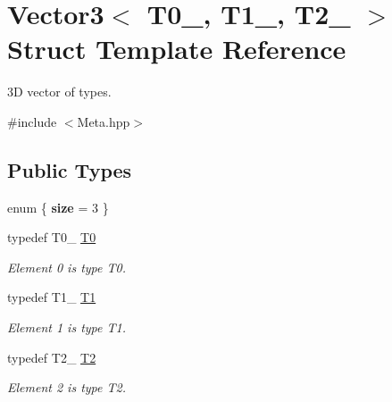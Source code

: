 \hypertarget{struct_d_o_1_1_meta_1_1_vector3}{\section{Vector3$<$ T0\-\_\-, T1\-\_\-, T2\-\_\- $>$ Struct Template Reference}
\label{struct_d_o_1_1_meta_1_1_vector3}
}


3\-D vector of types.  




{\ttfamily \#include $<$Meta.\-hpp$>$}

\subsection*{Public Types}
\begin{DoxyCompactItemize}
\item 
enum \{ {\bfseries size} = 3
 \}
\item 
\hypertarget{struct_d_o_1_1_meta_1_1_vector3_a6f4dd1548d86d57a7e5bdf98e74025cd}{typedef T0\-\_\- \hyperlink{struct_d_o_1_1_meta_1_1_vector3_a6f4dd1548d86d57a7e5bdf98e74025cd}{T0}}\label{struct_d_o_1_1_meta_1_1_vector3_a6f4dd1548d86d57a7e5bdf98e74025cd}

\begin{DoxyCompactList}\small\item\em Element 0 is type T0. \end{DoxyCompactList}\item 
\hypertarget{struct_d_o_1_1_meta_1_1_vector3_ae11d8678c6e0ac8e98f27b6dfdb5d73e}{typedef T1\-\_\- \hyperlink{struct_d_o_1_1_meta_1_1_vector3_ae11d8678c6e0ac8e98f27b6dfdb5d73e}{T1}}\label{struct_d_o_1_1_meta_1_1_vector3_ae11d8678c6e0ac8e98f27b6dfdb5d73e}

\begin{DoxyCompactList}\small\item\em Element 1 is type T1. \end{DoxyCompactList}\item 
\hypertarget{struct_d_o_1_1_meta_1_1_vector3_acbff7929c9f657ca83ddd209a08f7d62}{typedef T2\-\_\- \hyperlink{struct_d_o_1_1_meta_1_1_vector3_acbff7929c9f657ca83ddd209a08f7d62}{T2}}\label{struct_d_o_1_1_meta_1_1_vector3_acbff7929c9f657ca83ddd209a08f7d62}

\begin{DoxyCompactList}\small\item\em Element 2 is type T2. \end{DoxyCompactList}\end{DoxyCompactItemize}


